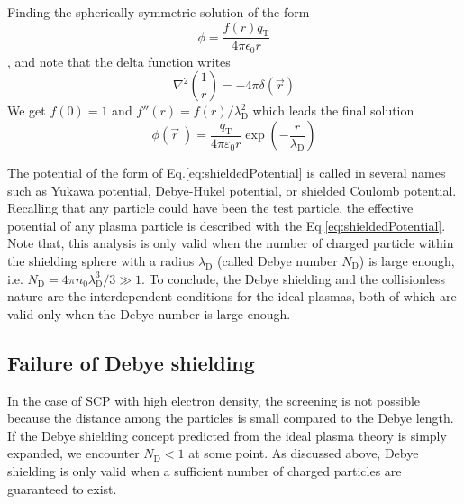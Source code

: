 Finding the spherically symmetric solution of the form
\begin{equation}
\phi=\frac{f(r) q_\text{T}}{4 \pi \epsilon_{0} r}
\end{equation}
, and note that the delta function writes 
\begin{equation}
\nabla^{2}\left(\frac{1}{r}\right)=-4 \pi \delta \left( \vec{r} \right)
\end{equation}
We get $f(0)=1$ and $f''(r)=f(r)/\lambda_\text{D}^2$ which leads the final solution 
\begin{equation}
\phi \left( \vec{r} ~\right) = \frac{q_\text{T}}{4 \pi \varepsilon_0 r} \exp \left( -\frac{r}{\lambda_\text{D}} \right)
\label{eq:shieldedPotential}
\end{equation}

The potential of the form of Eq.\ref{eq:shieldedPotential} is called in several names such as Yukawa potential, Debye-H\"{u}kel potential, or shielded Coulomb potential. Recalling that any particle could have been the test particle, the effective potential of any plasma particle is described with the Eq.\ref{eq:shieldedPotential}. Note that, this analysis is only valid when the number of charged particle within the shielding sphere with a radius $\lambda_\text{D}$ (called Debye number $N_\text{D}$) is large enough, i.e. $N_\text{D} = 4 \pi n_0 \lambda_\text{D}^3/3 \gg 1$. To conclude, the Debye shielding and the collisionless nature are the interdependent conditions for the ideal plasmas, both of which are valid only when the Debye number is large enough.

\subsection{Failure of Debye shielding}
\label{sec:ch3-1-2}

In the case of SCP with high electron density, the screening is not possible because the distance among the particles is small compared to the Debye length. If the Debye shielding concept predicted from the ideal plasma theory is simply expanded, we encounter $N_\text{D} < 1$ at some point. As discussed above, Debye shielding is only valid when a sufficient number of charged particles are guaranteed to exist.

